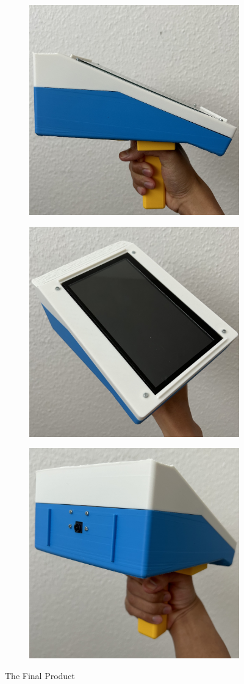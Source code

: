 \begin{figure}[ht!]
    \centering
    \begin{subfigure}[c]{0.45\textwidth}
        \begin{minipage}{\textwidth}
            \centering
            \includegraphics[height=6 cm]{texs/Part1/chapter5/image/final1.jpg}
        \end{minipage}
    \end{subfigure}
    \begin{subfigure}[c]{0.45\textwidth}
        \begin{minipage}{\textwidth}
            \centering
            \includegraphics[height=6 cm]{texs/Part1/chapter5/image/final2.jpg}
        \end{minipage}
    \end{subfigure}
    \par\bigskip
    \begin{subfigure}[c]{0.45\textwidth}
        \begin{minipage}{\textwidth}
            \centering
            \includegraphics[height=6 cm]{texs/Part1/chapter5/image/final3.jpg}
        \end{minipage}
    \end{subfigure}
    \caption{The Final Product}
    \label{fig:finalproduct}
\end{figure}

